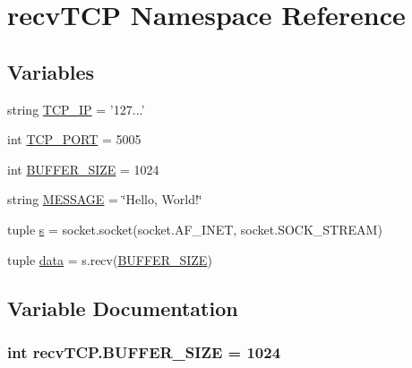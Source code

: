 \hypertarget{namespacerecvTCP}{}\section{recv\+T\+C\+P Namespace Reference}
\label{namespacerecvTCP}
\subsection*{Variables}
\begin{DoxyCompactItemize}
\item 
string \hyperlink{namespacerecvTCP_aa05e3ee6e3ba40a6130d0ee057f07106}{T\+C\+P\+\_\+\+I\+P} = '127...'
\item 
int \hyperlink{namespacerecvTCP_a567a4b8a1978b161e49e7b5f6bc860ac}{T\+C\+P\+\_\+\+P\+O\+R\+T} = 5005
\item 
int \hyperlink{namespacerecvTCP_a4e276e5f122dc64a3a9e9759fc06e649}{B\+U\+F\+F\+E\+R\+\_\+\+S\+I\+Z\+E} = 1024
\item 
string \hyperlink{namespacerecvTCP_a4b1a41c5ae1629d9645ff3932c444fb8}{M\+E\+S\+S\+A\+G\+E} = \char`\"{}Hello, World!\char`\"{}
\item 
tuple \hyperlink{namespacerecvTCP_a3f01302de230c87561ea7d067e8a6243}{s} = socket.\+socket(socket.\+A\+F\+\_\+\+I\+N\+E\+T, socket.\+S\+O\+C\+K\+\_\+\+S\+T\+R\+E\+A\+M)
\item 
tuple \hyperlink{namespacerecvTCP_a29405b8c214c90736842cb457dad5d51}{data} = s.\+recv(\hyperlink{namespacerecvTCP_a4e276e5f122dc64a3a9e9759fc06e649}{B\+U\+F\+F\+E\+R\+\_\+\+S\+I\+Z\+E})
\end{DoxyCompactItemize}


\subsection{Variable Documentation}
\hypertarget{namespacerecvTCP_a4e276e5f122dc64a3a9e9759fc06e649}{}
\subsubsection[{B\+U\+F\+F\+E\+R\+\_\+\+S\+I\+Z\+E}]{\setlength{\rightskip}{0pt plus 5cm}int recv\+T\+C\+P.\+B\+U\+F\+F\+E\+R\+\_\+\+S\+I\+Z\+E = 1024}\label{namespacerecvTCP_a4e276e5f122dc64a3a9e9759fc06e649}
\hypertarget{namespacerecvTCP_a29405b8c214c90736842cb457dad5d51}{}
